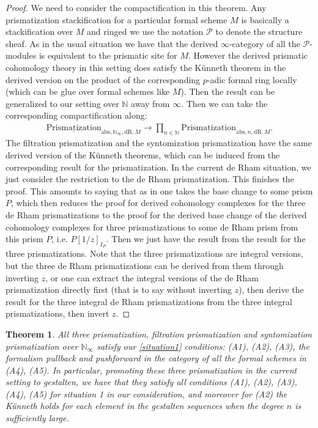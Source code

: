 \documentclass[12pt]{article}
\newtheorem{theorem}{Theorem}
\theoremstyle{definition}
\begin{document}
\begin{proof}
We need to consider the compactification in this theorem. Any prismatization   stackification for a particular formal scheme $M$ is basically a stackification over $M$ and ringed we use the notation $\mathcal{P}$ to denote the structure sheaf. As in the usual situation we have that the derived $\infty$-category of all the $\mathcal{P}$-modules is equivalent to the prismatic site for $M$. However the derived prismatic cohomology theory in this setting does satisfy the K\"unneth theorem in the derived version on the product of the corresponding $p$-adic formal ring locally (which can be glue over formal schemes like $M$). Then the result can be generalized to our setting over $\mathbb{N}$ away from $\infty$. Then we can take the corresponding compactification along:
\begin{align}
{\underline{\mathrm{Prismatization}}}_{\mathrm{abs},\mathbb{N}_\infty,\mathrm{dR},M}\rightarrow  \prod_{n\in \mathbb{N}} {\underline{\mathrm{Prismatization}}}_{\mathrm{abs},n,\mathrm{dR},M}.
\end{align}
The filtration prismatization and the syntomization prismatization have the same derived version of the K\"unneth theorems, which can be induced from the corresponding result for the prismatization. In the current de Rham situation, we just consider the restriction to the de Rham prismatization. This finishes the proof. This amounts to saying that as in \cite{2BL2} one takes the base change to some prism $P$, which then reduces the proof for derived cohomology complexes for the three de Rham prismatizations to the proof for the derived base change of the derived cohomology complexes for three prismatizations to some de Rham prism from this prism $P$, i.e. $P[1/z]_{I_P}$. Then we just have the result from the result for the three prismatizations. Note that the three prismatizations are integral versions, but the three de Rham prismatizations can be derived from them through inverting $z$, or one can extract the integral versions of the de Rham prismatization directly first (that is to say without inverting $z$), then derive the result for the three integral de Rham prismatizations from the three integral prismatizations, then invert $z$.
\end{proof}

\begin{theorem}\label{theorem36}
All three prismatization, filtration prismatization and syntomization prismatization over $\mathbb{N}_\infty$ satisfy our \cref{situation1} conditions: (A1), (A2), (A3), the formalism pullback and pushforward in the category of all the formal schemes in (A4), (A5). In particular, promoting these three prismatization in the current setting to gestalten, we have that they satisfy all conditions (A1), (A2), (A3), (A4), (A5) for situation 1 in our consideration, and moreover for (A2) the K\"unneth holds for each element in the gestalten sequences when the degree $n$ is sufficiently large.
\end{theorem}
\end{document}
